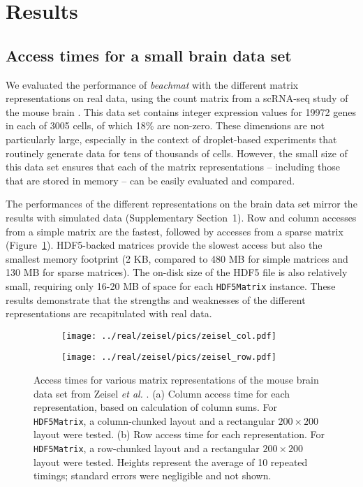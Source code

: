 \documentclass[10pt,letterpaper]{article}
\newcommand{\suppsecsim}{1}
\newcommand{\beachmat}{\textit{beachmat}}
\newcommand{\code}[1]{\texttt{#1}}
\begin{document}
\section*{Results}

\subsection*{Access times for a small brain data set}
We evaluated the performance of \beachmat{} with the different matrix representations on real data, using the count matrix from a scRNA-seq study of the mouse brain \cite{zeisel2015brain}.
This data set contains integer expression values for 19972 genes in each of 3005 cells, of which 18\% are non-zero.
These dimensions are not particularly large, especially in the context of droplet-based experiments that routinely generate data for tens of thousands of cells.
However, the small size of this data set ensures that each of the matrix representations -- including those that are stored in memory -- can be easily evaluated and compared.

The performances of the different representations on the brain data set mirror the results with simulated data (Supplementary Section~\suppsecsim{}).
Row and column accesses from a simple matrix are the fastest, followed by accesses from a sparse matrix (Figure~\ref{fig:zeisel}).
HDF5-backed matrices provide the slowest access but also the smallest memory footprint (2 KB, compared to 480 MB for simple matrices and 130 MB for sparse matrices).
The on-disk size of the HDF5 file is also relatively small, requiring only 16-20 MB of space for each \code{HDF5Matrix} instance. 
These results demonstrate that the strengths and weaknesses of the different representations are recapitulated with real data.

\begin{figure}[bt]
    \begin{subfigure}[b]{0.49\textwidth}
        \texttt{[image: ../real/zeisel/pics/zeisel\_col.pdf]}
        \caption{}
    \end{subfigure}
    \begin{subfigure}[b]{0.49\textwidth}
        \texttt{[image: ../real/zeisel/pics/zeisel\_row.pdf]}
        \caption{}
    \end{subfigure}
    \caption{Access times for various matrix representations of the mouse brain data set from Zeisel \textit{et al.} \cite{zeisel2015brain}.
        (a) Column access time for each representation, based on calculation of column sums.
        For \code{HDF5Matrix}, a column-chunked layout and a rectangular $200 \times 200$ layout were tested.
        (b) Row access time for each representation.
        For \code{HDF5Matrix}, a row-chunked layout and a rectangular $200 \times 200$ layout were tested.
        Heights represent the average of 10 repeated timings; standard errors were negligible and not shown.
    }
    \label{fig:zeisel}
\end{figure}
\end{document}
